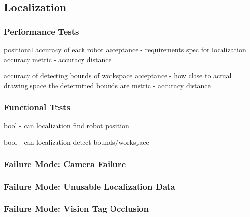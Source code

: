 
\subsection{Localization}
\label{sec:verification_localization}


\subsubsection{Performance Tests}
\label{sec:localization_pt}

positional accuracy of each robot
acceptance - requirements spec for localization accuracy
metric - accuracy distance

accuracy of detecting bounds of workspace
acceptance - how close to actual drawing space the determined bounds are
metric - accuracy distance

\subsubsection{Functional Tests}
\label{sec:localization_ft}

bool - can localization find robot position

bool - can localization detect bounds/workspace 


\subsubsection{Failure Mode: Camera Failure}
\label{sec:localization_cam}

\subsubsection{Failure Mode: Unusable Localization Data}
\label{sec:localization_unusable}

\subsubsection{Failure Mode: Vision Tag Occlusion}
\label{sec:localization_occlusion}

